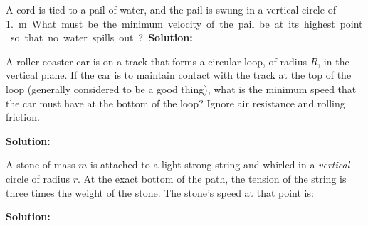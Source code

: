 \begin{example}
  A cord is tied to a pail of water, and the pail is swung
  in a vertical circle of \SI{1.}\metre. What must be the minimum velocity of
  the pail be at its highest point so that no water spills out?
  
  \textbf{Solution:}
\end{example}

\begin{example}
  A roller coaster car is on a track that forms a circular
  loop, of radius $R$, in the vertical plane. If the car is to maintain contact
  with the track at the top of the loop (generally considered to be a good
  thing), what is the minimum speed that the car must have at the bottom of the
  loop? Ignore air resistance and rolling friction.

  \textbf{Solution:}
\end{example}

\begin{example}
  A stone of mass $m$ is attached to a light strong string
  and whirled in a \emph{vertical} circle of radius $r$. At the exact bottom of
  the path, the tension of the string is three times the weight of the stone.
  The stone's speed at that point is:
  
  \textbf{Solution:}
\end{example}

